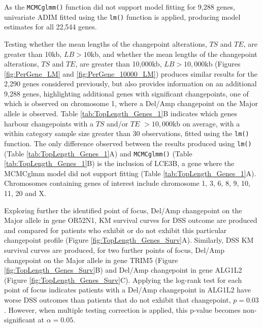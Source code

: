 As the \texttt{MCMCglmm()} function did not support model fitting for 9,288 genes, univariate ADIM fitted using the \texttt{lm()} function is applied, producing model estimates for all 22,544 genes.

Testing whether the mean lengths of the changepoint alterations, $TS$ and $TE$, are greater than 10kb, $LB > 10$kb, and whether the mean lengths of the changepoint alterations, $TS$ and $TE$, are greater than 10,000kb, $LB > 10,000$kb (Figures \ref{fig:PerGene_LM} and \ref{fig:PerGene_10000_LM}) produces similar results for the 2,290 genes considered previously, but also provides information on an additional 9,288 genes, highlighting additional genes with significant changepoints, one of which is observed on chromosome 1, where a Del/Amp changepoint on the Major allele is observed. Table \ref{tab:TopLength_Genes_1}B indicates which genes harbour changepoints with a $TS$ and/or $TE$ $>10,000$kb on average, with a within category sample size greater than 30 observations, fitted using the \texttt{lm()} function. The only difference observed between the results produced using \texttt{lm()} (Table \ref{tab:TopLength_Genes_1}A) and \texttt{MCMCglmm()} (Table \ref{tab:TopLength_Genes_1}B) is the inclusion of LCE3B, a gene where the MCMCglmm model did not support fitting (Table \ref{tab:TopLength_Genes_1}A). Chromosomes containing genes of interest include chromosome 1, 3, 6, 8, 9, 10, 11, 20 and X.

Exploring further the identified point of focus, Del/Amp changepoint on the Major allele in gene OR52N1, KM survival curves for DSS outcome are produced and compared for patients who exhibit or do not exhibit this particular changepoint profile (Figure \ref{fig:TopLength_Genes_Surv}A). Similarly, DSS KM survival curves are produced, for two further points of focus, Del/Amp changepoint on the Major allele in gene TRIM5 (Figure \ref{fig:TopLength_Genes_Surv}B) and Del/Amp changepoint in gene ALG1L2 (Figure \ref{fig:TopLength_Genes_Surv}C). Applying the log-rank test for each point of focus indicates patients with a Del/Amp changepoint in ALG1L2 have worse DSS outcomes than patients that do not exhibit that changepoint, $p = 0.03$. However, when multiple testing correction is applied, this p-value becomes non-significant at $\alpha = 0.05$. 

